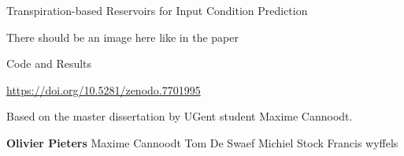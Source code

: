 \documentclass[final,aspectratio=169,12pt]{beamer}
\begin{document}
\begin{frame}{Transpiration-based Reservoirs for Input Condition Prediction}

\centering

There should be an image here like in the paper

\end{frame}

\begin{frame}{Code and Results}

\url{https://doi.org/10.5281/zenodo.7701995}

Based on the master dissertation by UGent student Maxime Cannoodt.

\textbf{Olivier Pieters}
Maxime Cannoodt
Tom De Swaef
Michiel Stock
Francis wyffels
	
\end{frame}
\end{document}
